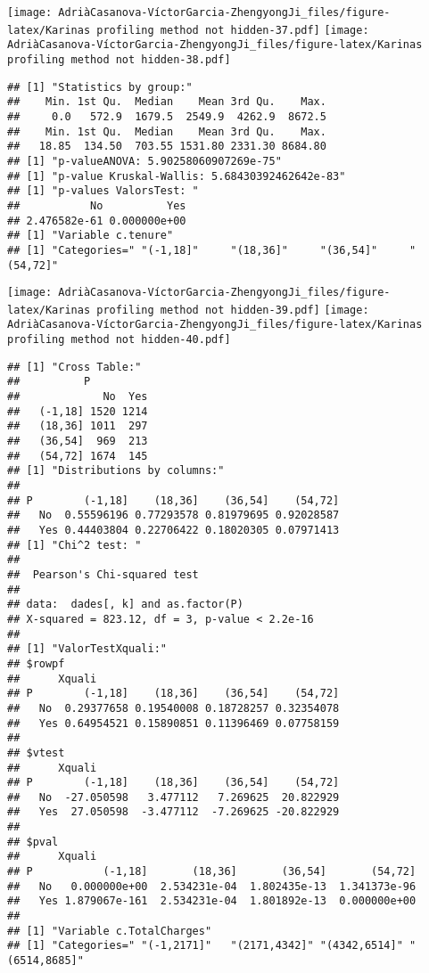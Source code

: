 \documentclass[
]{article}
\begin{document}
\texttt{[image: AdriàCasanova-VíctorGarcia-ZhengyongJi\_files/figure-latex/Karinas profiling method not hidden-37.pdf]}
\texttt{[image: AdriàCasanova-VíctorGarcia-ZhengyongJi\_files/figure-latex/Karinas profiling method not hidden-38.pdf]}

\begin{verbatim}
## [1] "Statistics by group:"
##    Min. 1st Qu.  Median    Mean 3rd Qu.    Max. 
##     0.0   572.9  1679.5  2549.9  4262.9  8672.5 
##    Min. 1st Qu.  Median    Mean 3rd Qu.    Max. 
##   18.85  134.50  703.55 1531.80 2331.30 8684.80 
## [1] "p-valueANOVA: 5.90258060907269e-75"
## [1] "p-value Kruskal-Wallis: 5.68430392462642e-83"
## [1] "p-values ValorsTest: "
##           No          Yes 
## 2.476582e-61 0.000000e+00 
## [1] "Variable c.tenure"
## [1] "Categories=" "(-1,18]"     "(18,36]"     "(36,54]"     "(54,72]"
\end{verbatim}

\texttt{[image: AdriàCasanova-VíctorGarcia-ZhengyongJi\_files/figure-latex/Karinas profiling method not hidden-39.pdf]}
\texttt{[image: AdriàCasanova-VíctorGarcia-ZhengyongJi\_files/figure-latex/Karinas profiling method not hidden-40.pdf]}

\begin{verbatim}
## [1] "Cross Table:"
##          P
##             No  Yes
##   (-1,18] 1520 1214
##   (18,36] 1011  297
##   (36,54]  969  213
##   (54,72] 1674  145
## [1] "Distributions by columns:"
##      
## P        (-1,18]    (18,36]    (36,54]    (54,72]
##   No  0.55596196 0.77293578 0.81979695 0.92028587
##   Yes 0.44403804 0.22706422 0.18020305 0.07971413
## [1] "Chi^2 test: "
## 
##  Pearson's Chi-squared test
## 
## data:  dades[, k] and as.factor(P)
## X-squared = 823.12, df = 3, p-value < 2.2e-16
## 
## [1] "ValorTestXquali:"
## $rowpf
##      Xquali
## P        (-1,18]    (18,36]    (36,54]    (54,72]
##   No  0.29377658 0.19540008 0.18728257 0.32354078
##   Yes 0.64954521 0.15890851 0.11396469 0.07758159
## 
## $vtest
##      Xquali
## P        (-1,18]    (18,36]    (36,54]    (54,72]
##   No  -27.050598   3.477112   7.269625  20.822929
##   Yes  27.050598  -3.477112  -7.269625 -20.822929
## 
## $pval
##      Xquali
## P           (-1,18]       (18,36]       (36,54]       (54,72]
##   No   0.000000e+00  2.534231e-04  1.802435e-13  1.341373e-96
##   Yes 1.879067e-161  2.534231e-04  1.801892e-13  0.000000e+00
## 
## [1] "Variable c.TotalCharges"
## [1] "Categories=" "(-1,2171]"   "(2171,4342]" "(4342,6514]" "(6514,8685]"
\end{verbatim}
\end{document}
